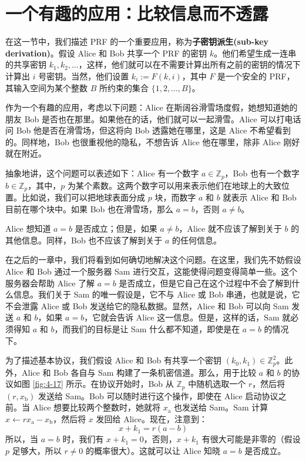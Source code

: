 \section{一个有趣的应用：比较信息而不透露}\label{sec:4-8}

在这一节中，我们描述 PRF 的一个重要应用，称为\textbf{子密钥派生(sub-key derivation)}。假设 Alice 和 Bob 共享一个 PRF 的密钥 $k$。他们希望生成一连串的共享密钥 $k_1,k_2,\dots$，这样，他们就可以在不需要计算出所有之前的密钥的情况下计算出 $i$ 号密钥。当然，他们设置 $k_i:=F(k,i)$，其中 $F$ 是一个安全的 PRF，其输入空间为某个整数 $B$ 所约束的集合 $\{1,2,\dots,B\}$。

作为一个有趣的应用，考虑以下问题：Alice 在斯阔谷滑雪场度假，她想知道她的朋友 Bob 是否也在那里。如果他在的话，他们就可以一起滑雪。Alice 可以打电话问 Bob 他是否在滑雪场，但这将向 Bob 透露她在哪里，这是 Alice 不希望看到的。同样地，Bob 也很重视他的隐私，不想告诉 Alice 他在哪里，除非 Alice 刚好就在附近。

抽象地讲，这个问题可以表述如下：Alice 有一个数字 $a\in\mathbb{Z}_p$，Bob 也有一个数字 $b\in\mathbb{Z}_p$，其中，$p$ 为某个素数。这两个数字可以用来表示他们在地球上的大致位置。比如说，我们可以把地球表面分成 $p$ 块，而数字 $a$ 和 $b$ 就表示 Alice 和 Bob 目前在哪个块中。如果 Bob 也在滑雪场，那么 $a=b$，否则 $a\neq b$。

Alice 想知道 $a=b$ 是否成立；但是，如果 $a\neq b$，Alice 就不应该了解到关于 $b$ 的其他信息。同样，Bob 也不应该了解到关于 $a$ 的任何信息。

在之后的一章中，我们将看到如何确切地解决这个问题。在这里，我们先不妨假设 Alice 和 Bob 通过一个服务器 Sam 进行交互，这能使得问题变得简单一些。这个服务器会帮助 Alice 了解 $a=b$ 是否成立，但是它自己在这个过程中不会了解到什么信息。我们关于 Sam 的唯一假设是，它不与 Alice 或 Bob 串通，也就是说，它不会泄露 Alice 或 Bob 发送给它的隐私数据。显然，Alice 和 Bob 可以向 Sam 发送 $a$ 和 $b$，如果 $a=b$，它就会告诉 Alice 这一信息。但是，这样的话，Sam 就必须得知 $a$ 和 $b$，而我们的目标是让 Sam 什么都不知道，即使是在 $a=b$ 的情况下。

为了描述基本协议，我们假设 Alice 和 Bob 有共享一个密钥 $(k_0,k_1)\in\mathbb{Z}_p^2$。此外，Alice 和 Bob 各自与 Sam 构建了一条机密信道。那么，用于比较 $a$ 和 $b$ 的协议如图 \ref{fig:4-17} 所示。在协议开始时，Bob 从 $\mathbb{Z}_p$ 中随机选取一个 $r$，然后将 $(r,x_\mathrm{b})$ 发送给 Sam。Bob 可以随时进行这个操作，即使在 Alice 启动协议之前。当 Alice 想要比较两个整数时，她就将 $x_\mathrm{a}$ 也发送给 Sam。Sam 计算 $x\leftarrow rx_\mathrm{a}-x_\mathrm{b}$，然后将 $x$ 发回给 Alice。现在，注意到：
\[
x+k_1=r(a-b)
\]
所以，当 $a=b$ 时，我们有 $x+k_1=0$，否则，$x+k_1$ 有很大可能是非零的（假设 $p$ 足够大，所以 $r\neq0$ 的概率很大）。这就可以让 Alice 知晓 $a=b$ 是否成立。


